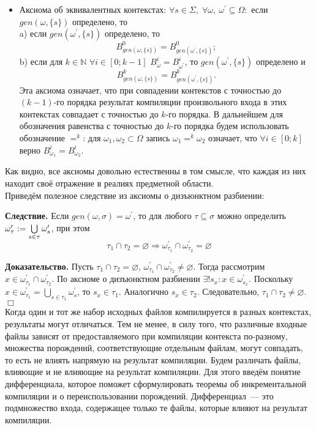 \begin{itemize}	
	\item Аксиома об эквивалентных контекстах: $\forall s \in \Sigma,\; \forall \omega,\: \omega^\prime \subseteq \Omega:$ если $gen(\omega, \{s\})$ определено, то\\
	a) если $gen(\omega^\prime, \{s\})$ определено, то $$B^0_{gen(\omega, \{s\})} = B^0_{gen(\omega^\prime, \{s\})};$$
	b) если для $k \in \mathbb{N}$ $\forall i \in [0; k-1]$ $B^i_{\omega} = B^i_{\omega^\prime}$, то $gen(\omega^\prime, \{s\})$ определено и $$B^k_{gen(\omega, \{s\})} = B^k_{gen(\omega^\prime, \{s\})}.$$
	Эта аксиома означает, что при совпадении контекстов с точностью до $(k-1)$-го порядка результат компиляции произвольного входа в этих контекстах совпадает с точностью до $k$-го порядка. В дальнейшем для обозначения равенства с точностью до $k$-го порядка будем использовать обозначение $=^k$: для $\omega_1, \omega_2 \subset \Omega$ запись $\omega_1 =^k \omega_2$ означает, что $\forall i \in [0; k]$ верно $B^i_{\omega_1} = B^i_{\omega_2}$.
\end{itemize}

Как видно, все аксиомы довольно естественны в том смысле, что каждая из них находит своё отражение в реалиях предметной области.\\

Приведём полезное следствие из аксиомы о дизъюнктном разбиении:

\textbf{Следствие.}
Если $gen(\omega, \sigma) = \omega^\prime$, то для любого $\tau \subseteq \sigma$ можно определить $\omega^\prime_\tau := \bigcup\limits_{s\in\tau}\omega^\prime_s$, при этом
$$\tau_1 \cap \tau_2 = \varnothing \Rightarrow \omega^\prime_{\tau_1} \cap \omega^\prime_{\tau_2} = \varnothing$$

\textbf{Доказательство.} Пусть $\tau_1 \cap \tau_2 = \varnothing$, $\omega^\prime_{\tau_1} \cap \omega^\prime_{\tau_2} \neq \varnothing$. Тогда рассмотрим $x \in \omega^\prime_{\tau_1} \cap \omega^\prime_{\tau_2}$. По аксиоме о дизъюнктном разбиении $\exists ! s_x: x \in \omega^\prime_{s_x}$. Поскольку $x \in \omega^\prime_{\tau_1} = \bigcup\limits_{s\in\tau_1}\omega^\prime_s$, то $s_x \in \tau_1$. Аналогично $s_x \in \tau_2$. Следовательно, $\tau_1 \cap \tau_2 \neq \varnothing$. $\Box$\\


Когда один и тот же набор исходных файлов компилируется в разных контекстах, результаты могут отличаться. Тем не менее, в силу того, что различные входные файлы зависят от предоставляемого при компиляции контекста по-разному, множества порождений, соответствующие отдельным файлам, могут совпадать, то есть не влиять напрямую на результат компиляции. Будем различать файлы, влияющие и не влияющие на результат компиляции. Для этого введём понятие дифференциала, которое поможет сформулировать теоремы об инкрементальной компиляции и о переиспользовании порождений. Дифференциал~--- это подмножество входа, содержащее только те файлы, которые влияют на результат компиляции.

